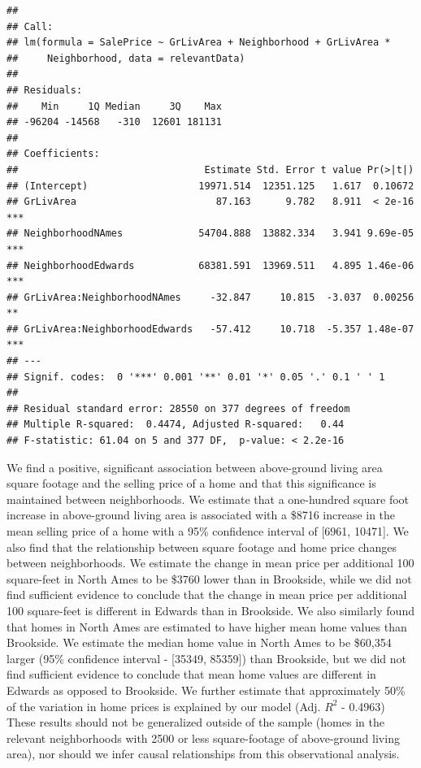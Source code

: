 \documentclass[american,]{article}
\begin{document}
\begin{verbatim}
## 
## Call:
## lm(formula = SalePrice ~ GrLivArea + Neighborhood + GrLivArea * 
##     Neighborhood, data = relevantData)
## 
## Residuals:
##    Min     1Q Median     3Q    Max 
## -96204 -14568   -310  12601 181131 
## 
## Coefficients:
##                                Estimate Std. Error t value Pr(>|t|)    
## (Intercept)                   19971.514  12351.125   1.617  0.10672    
## GrLivArea                        87.163      9.782   8.911  < 2e-16 ***
## NeighborhoodNAmes             54704.888  13882.334   3.941 9.69e-05 ***
## NeighborhoodEdwards           68381.591  13969.511   4.895 1.46e-06 ***
## GrLivArea:NeighborhoodNAmes     -32.847     10.815  -3.037  0.00256 ** 
## GrLivArea:NeighborhoodEdwards   -57.412     10.718  -5.357 1.48e-07 ***
## ---
## Signif. codes:  0 '***' 0.001 '**' 0.01 '*' 0.05 '.' 0.1 ' ' 1
## 
## Residual standard error: 28550 on 377 degrees of freedom
## Multiple R-squared:  0.4474, Adjusted R-squared:   0.44 
## F-statistic: 61.04 on 5 and 377 DF,  p-value: < 2.2e-16
\end{verbatim}

We find a positive, significant association between above-ground living
area square footage and the selling price of a home and that this
significance is maintained between neighborhoods. We estimate that a
one-hundred square foot increase in above-ground living area is
associated with a \$8716 increase in the mean selling price of a home
with a 95\% confidence interval of {[}6961, 10471{]}. We also find that
the relationship between square footage and home price changes between
neighborhoods. We estimate the change in mean price per additional 100
square-feet in North Ames to be \$3760 lower than in Brookside, while we
did not find sufficient evidence to conclude that the change in mean
price per additional 100 square-feet is different in Edwards than in
Brookside. We also similarly found that homes in North Ames are
estimated to have higher mean home values than Brookside. We estimate
the median home value in North Ames to be \$60,354 larger (95\%
confidence interval - {[}35349, 85359{]}) than Brookside, but we did not
find sufficient evidence to conclude that mean home values are different
in Edwards as opposed to Brookside. We further estimate that
approximately 50\% of the variation in home prices is explained by our
model (Adj. \(R^2\) - 0.4963) These results should not be generalized
outside of the sample (homes in the relevant neighborhoods with 2500 or
less square-footage of above-ground living area), nor should we infer
causal relationships from this observational analysis.
\end{document}
